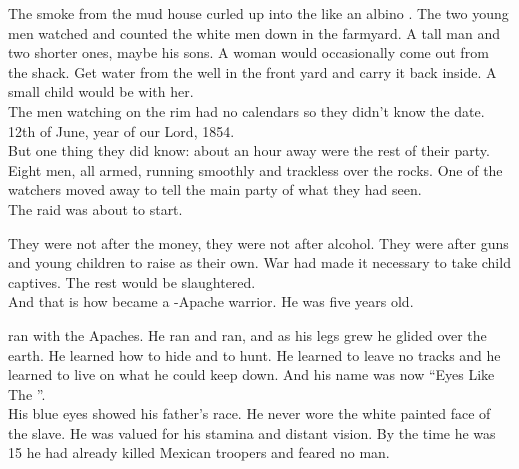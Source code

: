 The smoke from the mud house curled up into the  like an albino . The two young men watched and counted the white men down in the farmyard. A tall man and two shorter ones, maybe his sons. A woman would occasionally come out from the shack. Get water from the well in the front yard and carry it back inside. A small child would be with her. \\

The men watching on the rim had no calendars so they didn't know the date. 12th of June, year of our Lord, 1854. \\

But one thing they did know: about an hour away were the rest of their party. Eight men, all armed, running smoothly and trackless over the rocks. One of the watchers moved away to tell the main party of what they had seen. \\

The raid was about to start. \\




They were not after the money, they were not after alcohol. They were after guns and young children to raise as their own. War had made it necessary to take child captives. The rest would be slaughtered. \\

And that is how  became a -Apache warrior.
He was five years old. \\





 ran with the Apaches. He ran and ran, and as his legs grew he glided over the  earth. He learned how to hide and to hunt. He learned to leave no tracks and he learned to live on what he could keep down. And his name was now ``Eyes Like The ''. \\

His blue eyes showed his father's race. He never wore the white painted face of the slave. He was valued for his stamina and distant vision. By the time he was 15 he had already killed Mexican troopers and feared no man. \\

